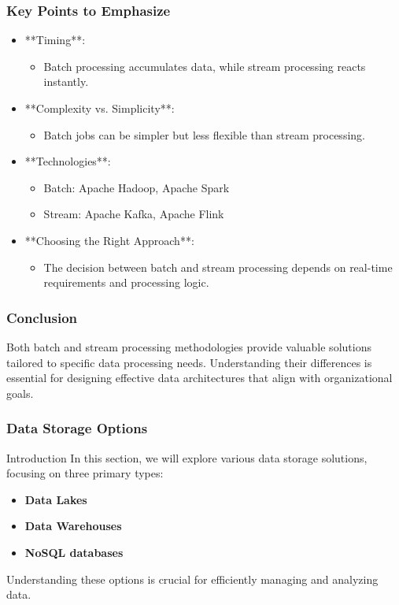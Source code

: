 \documentclass[aspectratio=169]{beamer}
\begin{document}
\begin{frame}[fragile]
    \frametitle{Key Points to Emphasize}
    \begin{itemize}
        \item **Timing**: 
            \begin{itemize}
                \item Batch processing accumulates data, while stream processing reacts instantly.
            \end{itemize}
        \item **Complexity vs. Simplicity**: 
            \begin{itemize}
                \item Batch jobs can be simpler but less flexible than stream processing.
            \end{itemize}
        \item **Technologies**: 
            \begin{itemize}
                \item Batch: Apache Hadoop, Apache Spark
                \item Stream: Apache Kafka, Apache Flink
            \end{itemize}
        \item **Choosing the Right Approach**: 
            \begin{itemize}
                \item The decision between batch and stream processing depends on real-time requirements and processing logic.
            \end{itemize}
    \end{itemize}
\end{frame}

\begin{frame}[fragile]
    \frametitle{Conclusion}
    Both batch and stream processing methodologies provide valuable solutions tailored to specific data processing needs. Understanding their differences is essential for designing effective data architectures that align with organizational goals.
\end{frame}

\begin{frame}[fragile]
    \frametitle{Data Storage Options}
    \begin{block}{Introduction}
        In this section, we will explore various data storage solutions, focusing on three primary types:
        \begin{itemize}
            \item \textbf{Data Lakes}
            \item \textbf{Data Warehouses}
            \item \textbf{NoSQL databases}
        \end{itemize}
        Understanding these options is crucial for efficiently managing and analyzing data.
    \end{block}
\end{frame}
\end{document}
